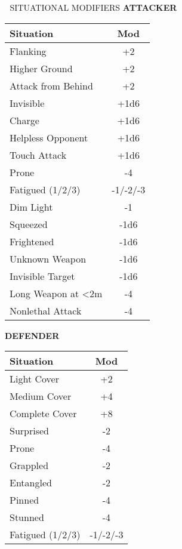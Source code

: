 \documentclass[10pt,a4paper,landscape]{article}
\begin{document}
\begin{multicols}{4}
		\begin{mainsection}{🎲 SITUATIONAL MODIFIERS}
			\textbf{ATTACKER}
			\begin{tabular}{@{}p{3.5cm}c@{}}
				\toprule
				\textbf{Situation} & \textbf{Mod} \\
				\midrule
				Flanking & +2 \\
				Higher Ground & +2 \\
				Attack from Behind & +2 \\
				Invisible & +1d6 \\
				Charge & +1d6 \\
				Helpless Opponent & +1d6 \\
				Touch Attack & +1d6 \\
				\midrule
				Prone & -4 \\
				Fatigued (1/2/3) & -1/-2/-3 \\
				Dim Light & -1 \\
				Squeezed & -1d6 \\
				Frightened & -1d6 \\
				Unknown Weapon & -1d6 \\
				Invisible Target & -1d6 \\
				Long Weapon at <2m & -4 \\
				Nonlethal Attack & -4 \\
				\bottomrule
			\end{tabular}
			
			\vspace{2mm}
			
			\textbf{DEFENDER}
			\begin{tabular}{@{}p{3.5cm}c@{}}
				\toprule
				\textbf{Situation} & \textbf{Mod} \\
				\midrule
				Light Cover & +2 \\
				Medium Cover & +4 \\
				Complete Cover & +8 \\
				\midrule
				Surprised & -2 \\
				Prone & -4 \\
				Grappled & -2 \\
				Entangled & -2 \\
				Pinned & -4 \\
				Stunned & -4 \\
				Fatigued (1/2/3) & -1/-2/-3 \\
				\bottomrule
			\end{tabular}
		\end{mainsection}
		

\end{multicols}
\end{document}
